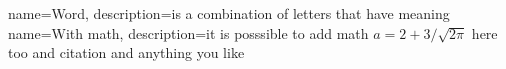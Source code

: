 \usepackage[xindy,toc]{glossaries}
\renewcommand*{\glstextformat}[1]{\textcolor{black}{\textbf{#1}}}



\makeglossaries
{}
{
  name=Word,
  description={is a combination of letters that have meaning}
}
{
  name=With math,
  description={it is posssible to add math $a=2+3/\sqrt{2\pi}$ here too and citation and anything you like}
}
